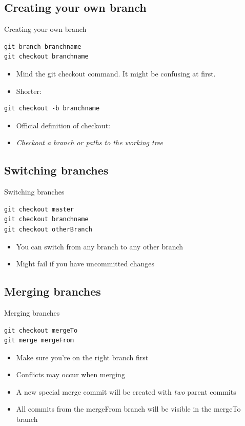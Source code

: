 \documentclass[10pt,a4paper]{beamer}
\begin{document}
\subsection{Creating your own branch}
\begin{frame}[fragile]{Creating your own branch}
\begin{verbatim}
git branch branchname
git checkout branchname
\end{verbatim}
\begin{itemize}
\item Mind the git checkout command. It might be confusing at first.
\item Shorter:
\end{itemize}

\begin{verbatim}
git checkout -b branchname
\end{verbatim}
\begin{itemize}
\item Official definition of checkout:
\item \textit{Checkout a branch or paths to the working tree}
\end{itemize}
\end{frame}

\subsection{Switching branches}
\begin{frame}[fragile]{Switching branches}
\begin{verbatim}
git checkout master
git checkout branchname
git checkout otherBranch
\end{verbatim}
\begin{itemize}
\item You can switch from any branch to any other branch
\item Might fail if you have uncommitted changes
\end{itemize}
\end{frame}

\subsection{Merging branches}
\begin{frame}[fragile]{Merging branches}
\begin{verbatim}
git checkout mergeTo
git merge mergeFrom
\end{verbatim}
\begin{itemize}
\item Make sure you're on the right branch first
\item Conflicts may occur when merging
\item A new special merge commit will be created with \textit{two} parent commits
\item All commits from the mergeFrom branch will be visible in the mergeTo branch
\end{itemize}
\end{frame}
\end{document}
